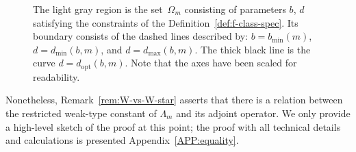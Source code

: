 \documentclass[a4paper]{amsart} %
\theoremstyle{definition}
\theoremstyle{remark}
\numberwithin{equation}{section}
\newcommand*{\LongArxivOrShortJournalVersion}[2]{#1}
\newcommand*{\specialbd}[1]{\Omega_{#1}}
\newcommand*{\bMin}{b_{\min}}
\newcommand*{\dMin}{d_{\min}}
\newcommand*{\dMax}{d_{\max}}
\newcommand*{\dOpt}{d_{\mathrm{opt}}}
\begin{document}
\begin{figure}[t]
	\caption{The light gray region
		is the set~$\specialbd{m}$
		consisting of parameters $b$, $d$
		satisfying the constraints of the Definition~\ref{def:f-class-spec}.
		Its boundary consists of the dashed lines described by:
		$b = \bMin(m)$, 
		$d= \dMin(b,m)$,
		and $d=\dMax(b,m)$.
		The thick black line is the curve $d = \dOpt(b,m)$.
		Note that the axes have been scaled for readability.}
	\label{fig:m-fixed-optimal-curve}
\end{figure}

Nonetheless, Remark~\ref{rem:W-vs-W-star} asserts that there is
a relation
between the restricted weak-type constant of $\Lambda_m$ and its adjoint operator.
\LongArxivOrShortJournalVersion{%
We only provide a high-level sketch of the proof at this point;
the proof with all technical details and calculations 
is presented Appendix~\ref{APP:equality}.}{%
We only provide a high-level sketch of the proof;
the proof with all technical details and calculations
can be found in Appendix~A 
of the arXiv version of this paper.}
\end{document}
